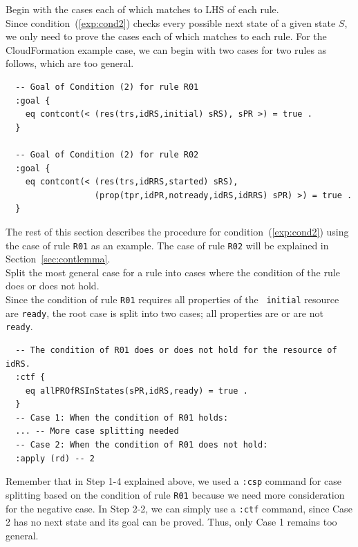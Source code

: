 \documentclass[12pt]{report}
\begin{document}
 Begin with the cases each of which matches to
LHS of each rule. \\ Since condition~(\ref{exp:cond2}) checks every
possible next state of a given state $S$, we only need to prove the
cases each of which matches to each rule. For the CloudFormation
example case, we can begin with two cases for two rules as follows,
which are too general.
\begin{verbatim}
  -- Goal of Condition (2) for rule R01
  :goal {
    eq contcont(< (res(trs,idRS,initial) sRS), sPR >) = true .
  }

  -- Goal of Condition (2) for rule R02
  :goal {
    eq contcont(< (res(trs,idRRS,started) sRS),
                  (prop(tpr,idPR,notready,idRS,idRRS) sPR) >) = true .
  }
\end{verbatim}

The rest of this section describes the procedure for condition~(\ref{exp:cond2})
using the case of rule {\tt R01} as an example. The case of rule {\tt R02} will
be explained in Section~\ref{sec:contlemma}.\\

 Split the most general case for a rule into
cases where the condition of the rule does or does not hold. \\ Since
the condition of rule {\tt R01} requires all properties of the {\tt
  initial} resource are {\tt ready}, the root case is split into two
cases; all properties are or are not {\tt ready}. 
\begin{verbatim}
  -- The condition of R01 does or does not hold for the resource of idRS.
  :ctf {
    eq allPROfRSInStates(sPR,idRS,ready) = true .
  }
  -- Case 1: When the condition of R01 holds:
  ... -- More case splitting needed
  -- Case 2: When the condition of R01 does not hold:
  :apply (rd) -- 2
\end{verbatim}
Remember that in Step 1-4 explained above, we used a {\tt :csp}
command for case splitting based on the condition of rule {\tt R01}
because we need more consideration for the negative case.  In Step
2-2, we can simply use a {\tt :ctf} command, since Case 2 has no next
state and its goal can be proved. Thus, only Case 1 remains too
general. \\
\end{document}
